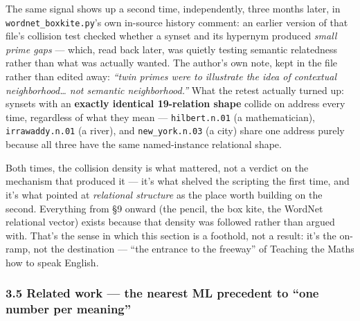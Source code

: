 \documentclass[
  10pt,
]{article}
\begin{document}
The same signal shows up a second time, independently, three months
later, in \texttt{wordnet\_boxkite.py}'s own in-source history comment:
an earlier version of that file's collision test checked whether a
synset and its hypernym produced \emph{small prime gaps} --- which, read
back later, was quietly testing semantic relatedness rather than what
was actually wanted. The author's own note, kept in the file rather than
edited away: \emph{``twin primes were to illustrate the idea of
contextual neighborhood\ldots{} not semantic neighborhood.''} What the
retest actually turned up: synsets with an \textbf{exactly identical
19-relation shape} collide on address every time, regardless of what
they mean --- \texttt{hilbert.n.01} (a mathematician),
\texttt{irrawaddy.n.01} (a river), and \texttt{new\_york.n.03} (a city)
share one address purely because all three have the same named-instance
relational shape.

Both times, the collision density is what mattered, not a verdict on the
mechanism that produced it --- it's what shelved the scripting the first
time, and it's what pointed at \emph{relational structure} as the place
worth building on the second. Everything from §9 onward (the pencil, the
box kite, the WordNet relational vector) exists because that density was
followed rather than argued with. That's the sense in which this section
is a foothold, not a result: it's the on-ramp, not the destination ---
``the entrance to the freeway'' of Teaching the Maths how to speak
English.

\hypertarget{related-work-the-nearest-ml-precedent-to-one-number-per-meaning}{%
\subsubsection{3.5 Related work --- the nearest ML precedent to ``one
number per
meaning''}\label{related-work-the-nearest-ml-precedent-to-one-number-per-meaning}}
\end{document}
